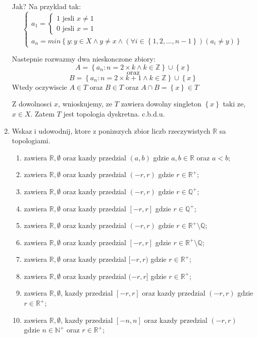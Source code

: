 \documentclass{article}
\begin{document}
\begin{enumerate}
Jak? Na przyklad tak:
$$
\begin{cases}
    a_{1} = \begin{cases} 1 \text{ jesli } x \neq 1 \\ 0 \text{ jesli } x = 1   \end{cases} \\
    a_{n} = min\left\{y: y \in X \land y \neq x \land (\forall i \in \left\{1,2,\dots,n-1\right\})(a_{i} \neq y)\right\}
\end{cases}$$

Nastepnie rozwazmy dwa nieskonczone zbiory:
$$A = \left\{a_{n}: n = 2\times k \land k \in \mathbb{Z}\right\} \cup \left\{x\right\}$$
$$\text{ oraz }$$ 
$$B = \left\{a_{n}: n = 2\times k + 1\land k \in \mathbb{Z}\right\} \cup \left\{x\right\} $$
Wtedy oczywiscie $A \in T$ oraz $B \in T$ oraz $A \cap B = \left\{x\right\} \in T$

Z dowolnosci $x$, wnioskujemy, ze $T$ zawiera dowolny singleton $\left\{x\right\}$ taki ze, $x \in X$. Zatem $T$ jest topologia dyskretna. c.b.d.u. 

\item Wskaz i udowodnij, ktore z ponizszych zbior liczb rzeczywistych $\mathbb{R}$ sa topologiami.

\begin{enumerate}[label={$T_{\arabic*} :$}]
\item zawiera $\mathbb{R}, \emptyset$ oraz kazdy przedzial $(a,b)$ gdzie $a,b \in \mathbb{R}$ oraz $a < b$;
\item zawiera $\mathbb{R}, \emptyset$ oraz kazdy przedzial $(-r,r)$ gdzie $r \in {\mathbb{R}}^{+}$;
\item zawiera $\mathbb{R}, \emptyset$ oraz kazdy przedzial $(-r,r)$ gdzie $r \in {\mathbb{Q}}^{+}$;
\item zawiera $\mathbb{R}, \emptyset$ oraz kazdy przedzial $[-r,r]$ gdzie $r \in {\mathbb{Q}}^{+}$;
\item zawiera $\mathbb{R}, \emptyset$ oraz kazdy przedzial $(-r,r)$ gdzie $r \in {\mathbb{R}}^{+} \setminus \mathbb{Q}$;
\item zawiera $\mathbb{R}, \emptyset$ oraz kazdy przedzial $[-r,r]$ gdzie $r \in {\mathbb{R}}^{+} \setminus \mathbb{Q}$;
\item zawiera $\mathbb{R}, \emptyset$ oraz kazdy przedzial $[-r,r)$ gdzie $r \in {\mathbb{R}}^{+}$;
\item zawiera $\mathbb{R}, \emptyset$ oraz kazdy przedzial $(-r,r]$ gdzie $r \in {\mathbb{R}}^{+}$;
\item zawiera $\mathbb{R}, \emptyset$, kazdy przedzial $[-r,r]$ oraz kazdy przedzial $(-r,r)$ gdzie $r \in {\mathbb{R}}^{+}$;
\item zawiera $\mathbb{R}, \emptyset$, kazdy przedzial $[-n,n]$ oraz kazdy przedzial $(-r,r)$ gdzie $n \in {\mathbb{N}}^{+}$ oraz  $r \in {\mathbb{R}}^{+}$;
\end{enumerate}


\end{enumerate}%
\end{document}

